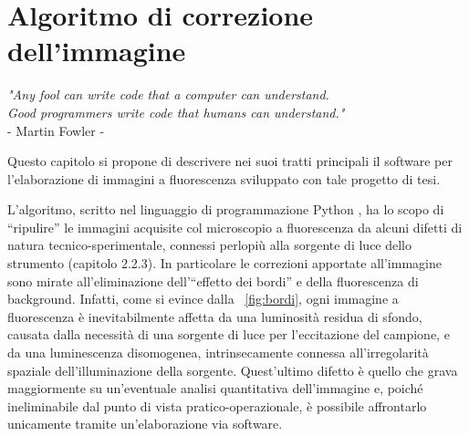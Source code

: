 \clearpage{\pagestyle{empty}\cleardoublepage}

\chapter{Algoritmo di correzione dell'immagine}

\begin{flushright}\begin{small}\textit{"Any fool can write code that a computer can understand.\\
Good programmers write code that humans can understand."}\\
- Martin Fowler -\\
\end{small}\end{flushright}

Questo capitolo si propone di descrivere nei suoi tratti principali il software per l'elaborazione di immagini a fluorescenza sviluppato con tale progetto di tesi. 

L'algoritmo, scritto nel linguaggio di programmazione Python \cite{python}, ha lo scopo di ``ripulire'' le immagini acquisite col microscopio a fluorescenza da alcuni difetti di natura tecnico-sperimentale, connessi perlopiù alla sorgente di luce dello strumento (capitolo 2.2.3). 
In particolare le correzioni apportate all'immagine sono mirate all'eliminazione dell'``effetto dei bordi'' e della fluorescenza di background. 
Infatti, come si evince dalla \figurename~\ref{fig:bordi}, ogni immagine a fluorescenza è inevitabilmente affetta da una luminosità residua di sfondo, causata dalla necessità di una sorgente di luce per l'eccitazione del campione, e da una luminescenza disomogenea, intrinsecamente connessa all'irregolarità spaziale dell'illuminazione della sorgente.
Quest'ultimo difetto è quello che grava maggiormente su un'eventuale analisi quantitativa dell'immagine e, poiché ineliminabile dal punto di vista pratico-operazionale, è possibile affrontarlo unicamente tramite un'elaborazione via software. 

